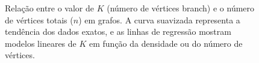 \begin{figure}[htbp]
{
    }
    \caption{Relação entre o valor de $K$ (número de vértices branch) e o número de vértices totais ($n$) em grafos. A curva suavizada representa a tendência dos dados exatos, e as linhas de regressão mostram modelos lineares de $K$ em função da densidade ou do número de vértices.}
    \label{fig:grafic_alfa}
\end{figure}